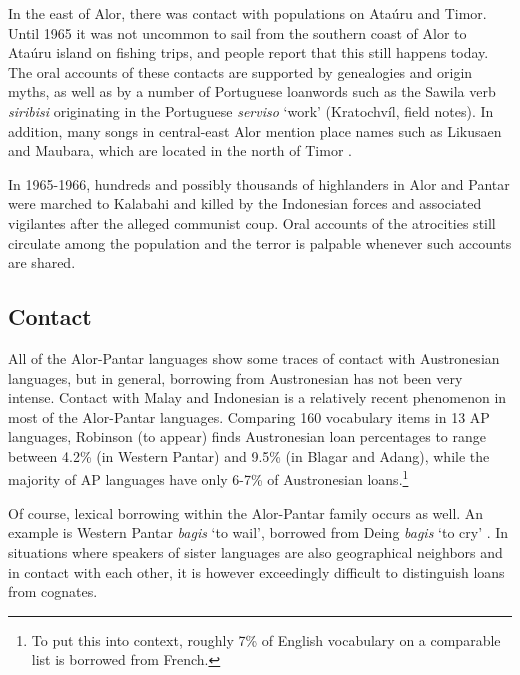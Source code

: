 In the east of Alor, there was contact with populations on Ata\'uru and Timor. Until 1965 it was not uncommon to sail from the southern coast of Alor to Ata\'uru island on fishing trips, and people report that this still happens today. The oral accounts of these contacts are supported by genealogies and origin myths, as well as by a number of Portuguese loanwords such as the Sawila verb \textit{siribisi} originating in the Portuguese \textit{serviso} `work' (Kratochv\'il, field notes). In addition, many songs in central-east Alor mention place names such as Likusaen and Maubara, which are located in the north of Timor \citep{WellfeltEtAl2013}.

In 1965-1966, hundreds and possibly thousands of highlanders in Alor and Pantar were marched to Kalabahi and killed by the Indonesian forces and associated vigilantes after the alleged communist coup. Oral accounts of the atrocities still circulate among the population and the terror is palpable whenever such accounts are shared.

\subsection{Contact}\label{sec:1:4.3}
All of the Alor-Pantar languages show some traces of contact with Austronesian languages, but in general, borrowing from Austronesian has not been very intense. Contact with Malay and Indonesian is a relatively recent phenomenon in most of the Alor-Pantar languages. Comparing {\Tilde}160 vocabulary items in 13 AP languages, Robinson (to appear) finds Austronesian loan percentages to range between 4.2\% (in Western Pantar) and 9.5\% (in Blagar and Adang), while the majority of AP languages have only 6-7\% of Austronesian loans.\footnote{To put this into context,  roughly 7\% of English vocabulary on a comparable list is borrowed from French. 
}

Of course, lexical borrowing within the Alor-Pantar family occurs as well. An example is Western Pantar \textit{bagis} `to wail', borrowed from Deing \textit{bagis} `to cry' \citep{HoltonRobinsonTVhistory}. In situations where speakers of sister languages are also geographical neighbors and in contact with each other, it is however exceedingly difficult to distinguish loans from cognates.

